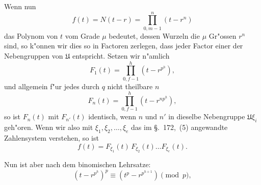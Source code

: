 \documentclass[12pt,a4paper]{article}
\theoremstyle{weber}
\begin{document}
Wenn nun
\[
f(t) = N(t-r) = \prod_{0, m-1}^{n}(t - r^n)
\]
das Polynom von $t$ vom Grade $\mu$ bedeutet, dessen Wurzeln die
$\mu$ Gr"ossen $r^n$ sind, so k"onnen wir dies so in Factoren zerlegen,
dass jeder Factor einer der Nebengruppen von $\mathfrak{U}$ entspricht.
Setzen wir n"amlich
\begin{equation}\label{eq:s173-1}
F_1(t) = \prod_{0, f-1}^{h}(t - r^{p^h}),
\end{equation}
und allgemein f"ur jedes durch $q$ nicht theilbare $n$
\begin{equation}\label{eq:s173-2}
F_n(t) = \prod_{0, f-1}^{h}(t - r^{np^h}),
\end{equation}
so ist $F_n(t)$ mit $F_{n'}(t)$ identisch, wenn $n$ und $n'$ in dieselbe
Nebengruppe $\mathfrak{U}\xi_i$ geh"oren. Wenn wir also mit $\xi_1, \xi_2, \dots, \xi_e$ das
im \S.~172,~(5) angewandte Zahlensystem verstehen, so ist
\begin{equation}\label{eq:s173-3}
f(t) = F_{\xi_1}(t)\,F_{\xi_2}(t)\dots F_{\xi_e}(t).
\end{equation}

Nun ist aber nach dem binomischen Lehrsatze:
\[
(t - r^{p^h})^p \equiv (t^p - r^{p^{h+1}}) \pmod{p},
\]
\end{document}
